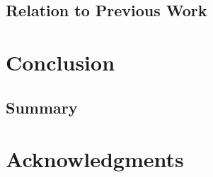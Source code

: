 \documentclass[usenatbib,usegraphicx,letterpaper]{mn2e}
\begin{document}
\subsection{Relation to Previous Work}
\label{subsec:previouswork}


\section{Conclusion}
\label{sec:conclusion}

\subsection{Summary}
\label{subsec:summary}

\section*{Acknowledgments}


\end{document}
